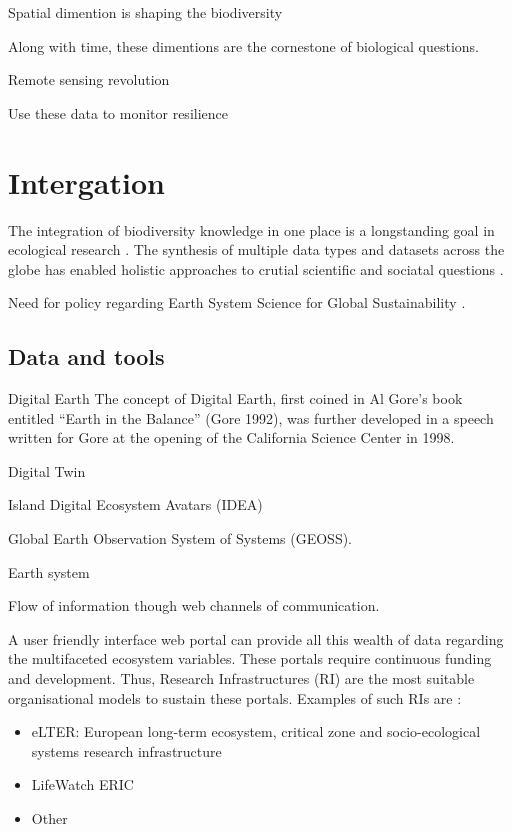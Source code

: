 Spatial dimention is shaping the biodiversity

Along with time, these dimentions are the cornestone of 
biological questions. 


Remote sensing revolution

Use these data to monitor resilience \citep{Lenton2022resilience}

\section{Intergation}
\label{sec:crete-integration}

The integration of biodiversity knowledge in one place is a longstanding
goal in ecological research \citep{Walter_2012}. The synthesis of multiple
data types and datasets across the globe has enabled 
holistic approaches to crutial scientific and sociatal questions \citep{heberling_j_mason_data_2021}.

Need for policy regarding Earth System Science for Global
Sustainability \citep{reid2010earth}.

\subsection{Data and tools}
\label{sec:data-tools}

Digital Earth
The concept of Digital Earth, first coined in Al Gore’s book entitled 
“Earth in the Balance” (Gore 1992), was further developed in a speech
written for Gore at the opening of the California Science Center in 1998.

Digital Twin

Island Digital Ecosystem Avatars (IDEA)

Global Earth Observation System of Systems (GEOSS).

Earth system

Flow of information though web channels of communication.

A user friendly interface web portal can provide all this wealth of data
regarding the multifaceted ecosystem variables. These portals require 
continuous funding and development. Thus, Research Infrastructures (RI) are 
the most suitable organisational models to sustain these portals. Examples 
of such RIs are :

\begin{itemize}

    \item eLTER: European long-term ecosystem, critical zone and socio-ecological systems research infrastructure 
    \item LifeWatch ERIC
    \item Other 

\end{itemize}

